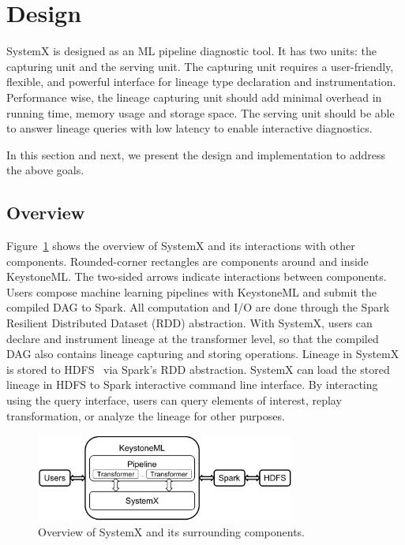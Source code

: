 \documentclass{sig-alternate}
\begin{document}
\section{Design}
\label{sec:Design}
SystemX is designed as an ML pipeline diagnostic tool. 
It has two units: the capturing unit and the serving unit.
The capturing unit requires a user-friendly, flexible, and powerful interface for lineage type declaration and instrumentation.
Performance wise, the lineage capturing unit should add minimal overhead in running time, memory usage and storage space.
The serving unit should be able to answer lineage queries with low latency to enable interactive diagnostics.

In this section and next, we present the design and implementation to address the above goals.

\subsection{Overview}
Figure~\ref{fig:architecture} shows the overview of SystemX and its interactions with other components. 
Rounded-corner rectangles are components around and inside KeystoneML. 
The two-sided arrows indicate interactions between components.
Users compose machine learning pipelines with KeystoneML and submit the compiled DAG to Spark.
All computation and I/O are done through the Spark Resilient Distributed Dataset (RDD) abstraction.
With SystemX, users can declare and instrument lineage at the transformer level, 
so that the compiled DAG also contains lineage capturing and storing operations.
Lineage in SystemX is stored to HDFS~\cite{shvachko10} via Spark's RDD abstraction.
SystemX can load the stored lineage in HDFS to Spark interactive command line interface.
By interacting using the query interface, users can query elements of interest, replay transformation, or analyze
the lineage for other purposes.

\begin{figure}[h]
\begin{center}
    \includegraphics[width=85mm]{pictures/architecture}
\caption {Overview of SystemX and its surrounding components.
    \label{fig:architecture}
}
\end{center}
\end{figure}
\end{document}
